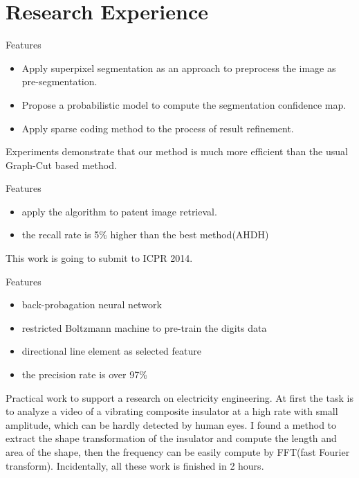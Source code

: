 \documentclass[11pt,a4paper, sans]{moderncv} %
\begin{document}
\section{Research Experience}


{
Features
\begin{itemize}
\item Apply superpixel segmentation as an approach to preprocess the image as pre-segmentation.
\item Propose a probabilistic model to compute the segmentation confidence map.
\item Apply sparse coding method to the process of result refinement.
\end{itemize}
Experiments demonstrate that our method is much more efficient than the usual  Graph-Cut based method.
}



{
Features
\begin{itemize}
\item apply the algorithm to patent image retrieval.
\item the recall rate is 5\% higher than the best method(AHDH)
\end{itemize}
This work is going to submit to ICPR 2014.
}

{
Features
\begin{itemize}
\item back-probagation neural network
\item restricted Boltzmann machine to pre-train the digits data
\item directional line element as selected feature
\item the precision rate is over 97\% 
\end{itemize}
}

{
Practical work to support a research on electricity engineering. At first the task is to analyze a video of a vibrating composite insulator at a high rate with small amplitude, which can be hardly detected by human eyes. I found a method to extract the shape transformation of the insulator and compute the length and area of the shape, then the frequency can be easily compute by FFT(fast Fourier transform). Incidentally, all these work is finished in 2 hours.
}
\end{document}
